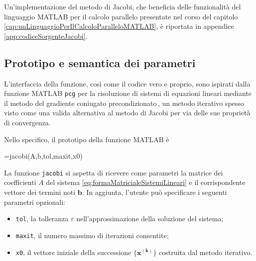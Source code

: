 Un'implementazione del metodo di Jacobi, che beneficia delle funzionalit\`a del linguaggio MATLAB per il
calcolo parallelo presentate nel corso del capitolo \ref{cap:unLinguaggioPerIlCalcoloParalleloMATLAB}, \`e riportata in appendice \ref{app:codiceSorgenteJacobi}.

\subsection{Prototipo e semantica dei parametri}
L'interfaccia della funzione, cos\`i come il codice vero e proprio, sono ispirati dalla funzione MATLAB
\lstinline{pcg} per la risoluzione di sistemi di equazioni lineari mediante il metodo del gradiente coniugato precondizionato\,\cite{TheMathWorksincPcgSolveSystem},
un metodo iterativo spesso visto come una valida alternativa al metodo di Jacobi per via delle sue propriet\`a di convergenza.

Nello specifico, il prototipo della funzione MATLAB \`e
\begin{matlabcode}
    =jacobi(A,b,tol,maxit,x0)
\end{matlabcode}
La funzione \lstinline{jacobi} si aspetta di ricevere come parametri la matrice dei coefficienti $A$ del sistema \eqref{eq:formaMatricialeSistemiLineari} e il corrispondente vettore dei termini noti $\mathbf{b}$.\newline
In aggiunta, l'utente pu\`o specificare i seguenti parametri opzionali:
\begin{itemize}
    \item \lstinline{tol}, la tolleranza $\varepsilon$ nell'approssimazione della soluzione del sistema;
    \item \lstinline{maxit}, il numero massimo di iterazioni consentite;
    \item \lstinline{x0}, il vettore iniziale della successione $\mathbf{\{x^{(k)}\}}$ costruita dal metodo iterativo.
\end{itemize}

